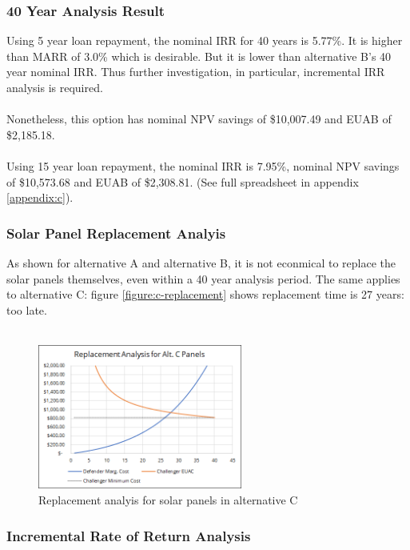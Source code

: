 \documentclass[10pt,letterpaper]{article}
\begin{document}
\subsubsection{40 Year Analysis Result}\label{subsection:c-40}

Using 5 year loan repayment, the nominal IRR for 40 years is 5.77\%. It is higher than MARR of 3.0\% which is desirable. But it is lower than alternative B's 40 year nominal IRR. Thus further investigation, in particular, incremental IRR analysis is required.\\
\\
Nonetheless, this option has nominal NPV savings of \$10,007.49 and EUAB of \$2,185.18.\\
\\
Using 15 year loan repayment, the nominal IRR is 7.95\%, nominal NPV savings of \$10,573.68 and EUAB of \$2,308.81. (See full spreadsheet in appendix \ref{appendix:c}).\\

\subsubsection{Solar Panel Replacement Analyis}

As shown for alternative A and alternative B, it is not econmical to replace the solar panels themselves, even within a 40 year analysis period. The same applies to alternative C: figure \ref{figure:c-replacement} shows replacement time is 27 years: too late.\\
\\
\begin{figure}[H]
	\centering
	\includegraphics[width=0.6\textwidth]{assets/1534568535020}
	\caption{Replacement analyis for solar panels in alternative C}
	\label{fig:c-replacement}
\end{figure}

\subsubsection{Incremental Rate of Return Analysis}
\end{document}
